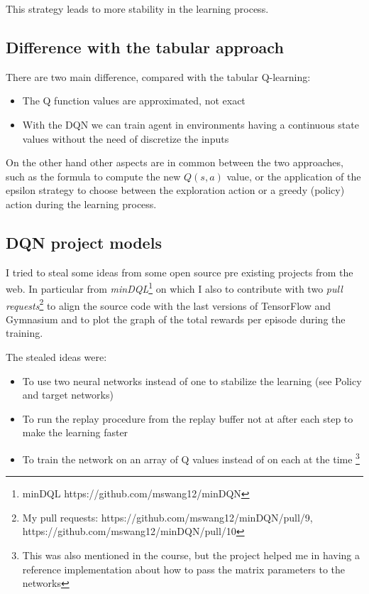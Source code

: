 \documentclass{article}
\begin{document}
This strategy leads to more stability in the learning process.

\subsection{Difference with the tabular approach}

There are two main difference, compared with the tabular Q-learning:

\begin{itemize}
  \item{The Q function values are approximated, not exact}
  \item{With the DQN we can train agent in environments having a continuous state values}
  without the need of discretize the inputs
\end{itemize}

On the other hand other aspects are in common between the two approaches, such as
the formula to compute the new $Q(s,a)$ value, or the application of the epsilon strategy
to choose between the exploration action or a greedy (policy) action during the learning process.

\subsection{DQN project models}

I tried to steal some ideas from some open source pre existing projects from the web.
In particular from \emph{minDQL}\footnote{minDQL https://github.com/mswang12/minDQN} on which I also to contribute with 
two \emph{pull requests}\footnote{My pull requests: https://github.com/mswang12/minDQN/pull/9, 
https://github.com/mswang12/minDQN/pull/10} 
to align the source code with the last versions of TensorFlow and Gymnasium
and to plot the graph of the total rewards per episode during the training.

The stealed ideas were:

\begin{itemize}
  \item{To use two neural networks instead of one to stabilize the learning (see Policy and target networks)}
  \item{To run the replay procedure from the replay buffer not at after each step to make the learning faster}
  \item{To train the network on an array of Q values instead of on each at the time
  \footnote{This was also mentioned in the course, but the project helped me in having a 
  reference implementation about how to pass the matrix parameters to the networks}}
\end{itemize}
\end{document}
